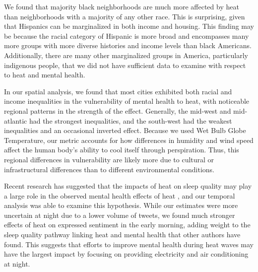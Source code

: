 \documentclass{article}
\begin{document}
We found that majority black neighborhoods are much more affected by heat than neighborhoods with a majority of any other race.  This is surprising, given that Hispanics can be marginalized in both income and housing.  This finding may be because the racial category of Hispanic is more broad and encompasses many more groups with more diverse histories and income levels than black Americans.  Additionally, there are many other marginalized groups in America, particularly indigenous people, that we did not have sufficient data to examine with respect to heat and mental health.  

In our spatial analysis, we found that most cities exhibited both racial and income inequalities in the vulnerability of mental health to heat, with noticeable regional patterns in the strength of the effect.  Generally, the mid-west and mid-atlantic had the strongest inequalities, and the south-west had the weakest inequalities and an occasional inverted effect.  Because we used Wet Bulb Globe Temperature, our metric accounts for how differences in humidity and wind speed affect the human body's ability to cool itself through perspiration.  Thus, this regional differences in vulnerability are likely more due to cultural or infrastructural differences than to different environmental conditions.

Recent research has suggested that the impacts of heat on sleep quality may play a large role in the observed mental health effects of heat \cite{Obradovich2017May, Mullins2019Dec}, and our temporal analysis was able to examine this hypothesis.  While our estimates were more uncertain at night due to a lower volume of tweets, we found much stronger effects of heat on expressed sentiment in the early morning, adding weight to the sleep quality pathway linking heat and mental health that other authors have found.  This suggests that efforts to improve mental health during heat waves may have the largest impact by focusing on providing electricity and air conditioning at night.
\end{document}
